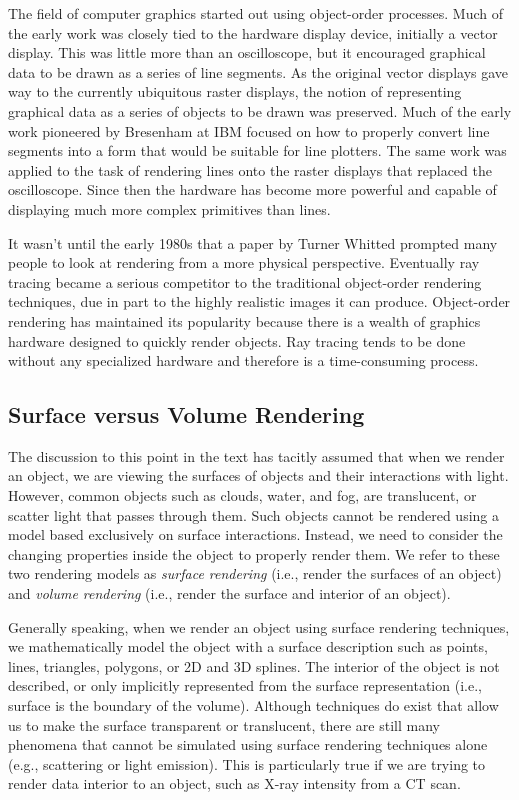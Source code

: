 The field of computer graphics started out using object-order processes. Much of the early work was closely tied to the hardware display device, initially a vector display. This was little more than an oscilloscope, but it encouraged graphical data to be drawn as a series of line segments. As the original vector displays gave way to the currently ubiquitous raster displays, the notion of representing graphical data as a series of objects to be drawn was preserved. Much of the early work pioneered by Bresenham \cite{Bresenham65} at IBM focused on how to properly convert line segments into a form that would be suitable for line plotters. The same work was applied to the task of rendering lines onto the raster displays that replaced the oscilloscope. Since then the hardware has become more powerful and capable of displaying much more complex primitives than lines.

It wasn't until the early 1980s that a paper by Turner Whitted \cite{Whitted80} prompted many people to look at rendering from a more physical perspective. Eventually ray tracing became a serious competitor to the traditional object-order rendering techniques, due in part to the highly realistic images it can produce. Object-order rendering has maintained its popularity because there is a wealth of graphics hardware designed to quickly render objects. Ray tracing tends to be done without any specialized hardware and therefore is a time-consuming process.

\subsection{Surface versus Volume Rendering}

The discussion to this point in the text has tacitly assumed that when we render an object, we are viewing the surfaces of objects and their interactions with light. However, common objects such as clouds, water, and fog, are translucent, or scatter light that passes through them. Such objects cannot be rendered using a model based exclusively on surface interactions. Instead, we need to consider the changing properties inside the object to properly render them. We refer to these two rendering models as \emph{surface rendering} (i.e., render the surfaces of an object) and \emph{volume rendering} (i.e., render the surface and interior of an object).

Generally speaking, when we render an object using surface rendering techniques, we mathematically model the object with a surface description such as points, lines, triangles, polygons, or 2D and 3D splines. The interior of the object is not described, or only implicitly represented from the surface representation (i.e., surface is the boundary of the volume). Although techniques do exist that allow us to make the surface transparent or translucent, there are still many phenomena that cannot be simulated using surface rendering techniques alone (e.g., scattering or light emission). This is particularly true if we are trying to render data interior to an object, such as X-ray intensity from a CT scan.

